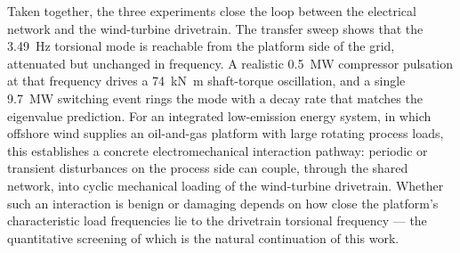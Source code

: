 Taken together, the three experiments close the loop between the electrical
network and the wind-turbine drivetrain. The transfer sweep shows that the
\SI{3.49}{\hertz} torsional mode is reachable from the platform side of the grid,
attenuated but unchanged in frequency. A realistic \SI{0.5}{\mega\watt}
compressor pulsation at that frequency drives a \SI{74}{\kilo\newton\metre}
shaft-torque oscillation, and a single \SI{9.7}{\mega\watt} switching event rings
the mode with a decay rate that matches the eigenvalue prediction. For an
integrated low-emission energy system, in which offshore wind supplies an
oil-and-gas platform with large rotating process loads, this establishes a
concrete electromechanical interaction pathway: periodic or transient
disturbances on the process side can couple, through the shared network, into
cyclic mechanical loading of the wind-turbine drivetrain. Whether such an
interaction is benign or damaging depends on how close the platform's
characteristic load frequencies lie to the drivetrain torsional frequency ---
the quantitative screening of which is the natural continuation of this work.
